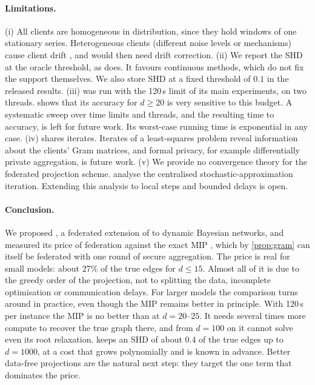 \paragraph{Limitations.}
(i) All clients are homogeneous in distribution, since they hold windows of one stationary series.
Heterogeneous clients (different noise levels or mechanisms) cause client drift
\citep{karimireddy2020scaffold}, and \feddbn{} would then need drift correction.
(ii) We report the SHD at the oracle threshold, as \exdbn{} does. It favours continuous methods,
which do not fix the support themselves. We also store SHD at a fixed threshold of $0.1$ in
the released results.
(iii) \exdbn{} was run with the 120\,s limit of its main experiments, on two threads.
 shows that its accuracy for $d\ge 20$ is very sensitive to this budget. A
systematic sweep over time limits and threads, and the resulting time to accuracy, is left
for future work. Its worst-case running time is exponential in any case.
(iv) \feddbn{} shares iterates. Iterates of a least-squares problem reveal information about
the clients' Gram matrices, and formal privacy, for example differentially private
aggregation, is future work.
(v) We provide no convergence theory for the federated projection scheme. \citet{ziu2024psi}
analyse the centralised stochastic-approximation iteration. Extending this analysis to local
steps and bounded delays is open.

\paragraph{Conclusion.}
We proposed \feddbn, a federated extension of \psidag{} to dynamic Bayesian networks, and
measured its price of federation against the exact MIP \exdbn{}, which by
\cref{prop:gram} can itself be federated with one round of secure aggregation. The price
is real for small models: about 27\% of the true edges for $d\le 15$. Almost all of it is
due to the greedy order of the projection, not to splitting the data, incomplete
optimisation or communication delays. For larger models the comparison turns around in
practice, even though the MIP remains better in principle. With 120\,s per instance the MIP
is no better than \feddbn{} at $d=20$--$25$. It needs several times more compute to recover
the true graph there, and from $d=100$ on it cannot solve even its root relaxation. \feddbn{}
keeps an SHD of about 0.4 of the true edges up to $d=1000$, at a cost that grows polynomially
and is known in advance. Better data-free projections are the natural next step: they
target the one term that dominates the price.
